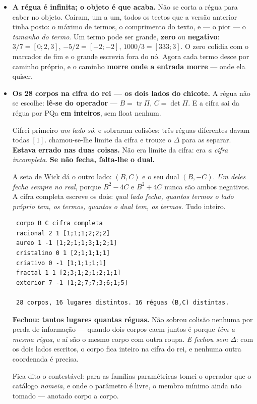 \documentclass[11pt]{article}
\theoremstyle{plain}
\theoremstyle{remark}
\begin{document}
\begin{itemize}
\item \textbf{A régua é infinita; o objeto é que acaba.} Não se corta a régua para caber no
objeto. Caíram, um a um, todos os tectos que a versão anterior tinha posto: o máximo de termos, o comprimento do
texto, e --- o pior --- o \emph{tamanho do termo}. Um termo pode ser grande, \textbf{zero} ou
\textbf{negativo}: $3/7 = [0;2,3]$, $-5/2 = [-2;-2]$, $1000/3 = [333;3]$. O zero colidia com o
marcador de fim e o grande escrevia fora do nó. Agora cada termo desce por caminho próprio, e o
caminho \textbf{morre onde a entrada morre} --- onde ela quiser.

\item \textbf{Os 28 corpos na cifra do rei --- os dois lados do chicote.} A régua não se escolhe:
\textbf{lê-se do operador} --- $B=\operatorname{tr}\Pi$, $C=\det\Pi$. E a cifra sai da régua por
PQa \textbf{em inteiros}, sem float nenhum.

Cifrei primeiro \emph{um lado só}, e sobraram colisões: três réguas diferentes davam todas $[1]$.
chamou-se-lhe limite da cifra e trouxe o $\Delta$ para as separar. \textbf{Estava errado nas duas
coisas.} Não era limite da cifra: era \emph{a cifra incompleta}. \textbf{Se não fecha, falta-lhe o
dual.}

A seta de Wick dá o outro lado: $(B,C)$ e o seu dual $(B,-C)$. \emph{Um deles fecha sempre no
real}, porque $B^2-4C$ e $B^2+4C$ nunca são ambos negativos. A cifra completa escreve os dois:
\emph{qual lado fecha, quantos termos o lado próprio tem, os termos, quantos o dual tem, os
termos.} Tudo inteiro.

\begin{verbatim}
 corpo B C cifra completa
 racional 2 1 [1;1;1;2;2;2]
 aureo 1 -1 [1;2;1;1;3;1;2;1]
 cristalino 0 1 [2;1;1;1;1]
 criativo 0 -1 [1;1;1;1;1]
 fractal 1 1 [2;3;1;2;1;2;1;1]
 exterior 7 -1 [1;2;7;7;3;6;1;5]

 28 corpos, 16 lugares distintos. 16 réguas (B,C) distintas.
\end{verbatim}

\textbf{Fechou: tantos lugares quantas réguas.} Não sobrou colisão nenhuma por perda de
informação --- quando dois corpos caem juntos é porque \emph{têm a mesma régua}, e aí são o mesmo
corpo com outra roupa. \emph{E fechou sem $\Delta$}: com os dois lados escritos, o corpo fica
inteiro na cifra do rei, e nenhuma outra coordenada é precisa.

Fica dito o contestável: para as famílias paramétricas tomei o operador que o catálogo
\emph{nomeia}, e onde o parâmetro é livre, o membro mínimo ainda não tomado --- anotado corpo a
corpo.


\end{itemize}
\end{document}
